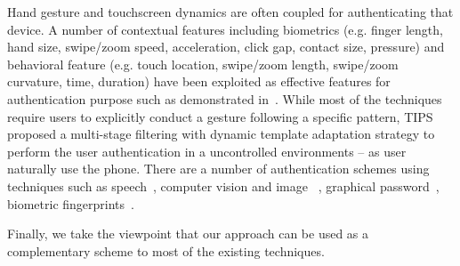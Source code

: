 Hand gesture and touchscreen dynamics are often coupled for
authenticating that device. A number of contextual features
including biometrics (e.g. finger length, hand size,
swipe/zoom speed, acceleration, click gap, contact size, pressure)
and behavioral feature (e.g. touch location, swipe/zoom length,
swipe/zoom curvature, time, duration) have been exploited as
effective features for authentication purpose such as demonstrated
in~\cite{sae2012biometric,frank2013touchalytics,cai2013mobile,feng2014tips}.
While most of the techniques require users to explicitly conduct a
gesture following a specific pattern, TIPS~\cite{feng2014tips}
proposed a multi-stage filtering with dynamic template adaptation
strategy to perform the user authentication in a uncontrolled
environments -- as user naturally use the phone. There are a number of
authentication schemes using techniques such as
speech~\cite{reynolds2000speaker}, computer vision and image
~\cite{bowyer2006survey}, graphical
password~\cite{biddle2012graphical,sherman2014user}, biometric
fingerprints~\cite{jain1997identity}. 


Finally, we take the viewpoint that our approach can be used as a complementary scheme to most
of the existing techniques.













